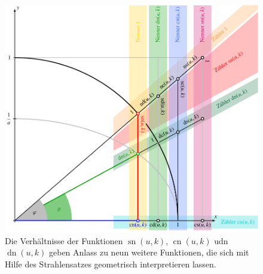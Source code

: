 %
%
\begin{figure}
\centering
\includegraphics[width=\textwidth]{chapters/110-elliptisch/images/jacobi12.pdf}
\caption{Die Verhältnisse der Funktionen
$\operatorname{sn}(u,k)$,
$\operatorname{cn}(u,k)$
udn
$\operatorname{dn}(u,k)$
geben Anlass zu neun weitere Funktionen, die sich mit Hilfe
des Strahlensatzes geometrisch interpretieren lassen.
\label{buch:elliptisch:fig:jacobi12}}
\end{figure}
